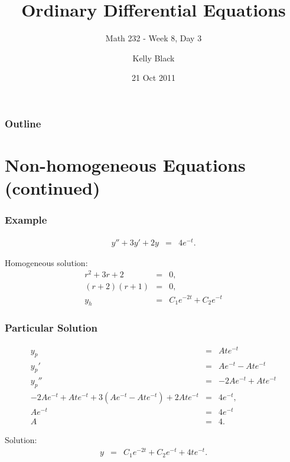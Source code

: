 \documentclass{beamer}
\newcommand{\lp}{\left(}
\newcommand{\rp}{\right)}
\begin{document}
\title{Ordinary Differential Equations}
\subtitle{Math 232 - Week 8, Day 3}

\author{Kelly Black}
\date{21 Oct 2011}

\begin{frame}
  \titlepage
\end{frame}

\begin{frame}
  \frametitle{Outline}
\end{frame}


\section{Non-homogeneous Equations (continued)}


\begin{frame}
  \frametitle{Example}

  \begin{eqnarray*}
    y'' + 3y' + 2y & = & 4 e^{-t}.
  \end{eqnarray*}

  {
    Homogeneous solution:
    \begin{eqnarray*}
      r^2 + 3r + 2 & = & 0, \\
      (r+2)(r+1) & = & 0, \\
      y_h & = & C_1 e^{-2t} + C_2 e^{-t}
    \end{eqnarray*}
  }

\end{frame}

\begin{frame}
  \frametitle{Particular Solution}

  \begin{eqnarray*}
    y_p & = & A t e^{-t} \\
    y_p' & = & A e^{-t} - Ate^{-t} \\
    y_p'' & = & -2A e^{-t} + At e^{-t} \\
    -2A e^{-t} + At e^{-t} + 3 \lp A e^{-t} - Ate^{-t} \rp 
    + 2 A t e^{-t} & = & 4 e^{-t}, \\
    A e^{-t} & = & 4 e^{-t} \\
    A & = & 4.
  \end{eqnarray*}

  Solution:
  \begin{eqnarray*}
    y & = & C_1 e^{-2t} + C_2 e^{-t} + 4 t e^{-t}.
  \end{eqnarray*}

\end{frame}
\end{document}
